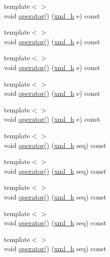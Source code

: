 \begin{DoxyCompactItemize}
\item 
{\footnotesize template$<$$>$ }\\void \hyperlink{struct_d_d4hep_1_1_converter_ad630b853386efd9e8fdefe008f1ecd4f}{operator()} (\hyperlink{class_d_d4hep_1_1_x_m_l_1_1_handle__t}{xml\_\-h} e) const
\item 
{\footnotesize template$<$$>$ }\\void \hyperlink{struct_d_d4hep_1_1_converter_a0244075da8fd0ca3f58cb2d3f1eae1e5}{operator()} (\hyperlink{class_d_d4hep_1_1_x_m_l_1_1_handle__t}{xml\_\-h} e) const
\item 
{\footnotesize template$<$$>$ }\\void \hyperlink{struct_d_d4hep_1_1_converter_ac2103dd4e8fa1443874b9fe0753f5485}{operator()} (\hyperlink{class_d_d4hep_1_1_x_m_l_1_1_handle__t}{xml\_\-h} e) const
\item 
{\footnotesize template$<$$>$ }\\void \hyperlink{struct_d_d4hep_1_1_converter_a06222925c37fe5b58a430c75bc9f0d21}{operator()} (\hyperlink{class_d_d4hep_1_1_x_m_l_1_1_handle__t}{xml\_\-h} e) const
\item 
{\footnotesize template$<$$>$ }\\void \hyperlink{struct_d_d4hep_1_1_converter_a38a5f9d50167466d9d4ca02c3090353b}{operator()} (\hyperlink{class_d_d4hep_1_1_x_m_l_1_1_handle__t}{xml\_\-h} e) const
\item 
{\footnotesize template$<$$>$ }\\void \hyperlink{struct_d_d4hep_1_1_converter_aab0de73ce1089856aafb386be385b317}{operator()} (\hyperlink{class_d_d4hep_1_1_x_m_l_1_1_handle__t}{xml\_\-h} seq) const
\item 
{\footnotesize template$<$$>$ }\\void \hyperlink{struct_d_d4hep_1_1_converter_aecf253ac0ea173d29b412fd0d9a22656}{operator()} (\hyperlink{class_d_d4hep_1_1_x_m_l_1_1_handle__t}{xml\_\-h} seq) const
\item 
{\footnotesize template$<$$>$ }\\void \hyperlink{struct_d_d4hep_1_1_converter_a5dca78c50fd5a859646e178bfda4528c}{operator()} (\hyperlink{class_d_d4hep_1_1_x_m_l_1_1_handle__t}{xml\_\-h} seq) const
\item 
{\footnotesize template$<$$>$ }\\void \hyperlink{struct_d_d4hep_1_1_converter_aaa0f45df01957c77b7b5736c1b1c6269}{operator()} (\hyperlink{class_d_d4hep_1_1_x_m_l_1_1_handle__t}{xml\_\-h} seq) const
\item 
{\footnotesize template$<$$>$ }\\void \hyperlink{struct_d_d4hep_1_1_converter_a3c464e986d3bc99e23f348beb950cf27}{operator()} (\hyperlink{class_d_d4hep_1_1_x_m_l_1_1_handle__t}{xml\_\-h} seq) const

\end{DoxyCompactItemize}
